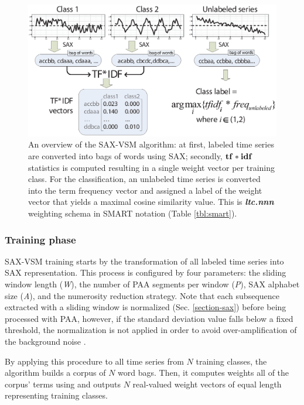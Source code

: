 \begin{figure}[t]
   \centering
   \includegraphics[width=148mm]{figures/SAX-VSM_overview.eps}
   \caption{
   An overview of the SAX-VSM algorithm: 
   at first, labeled time series are converted into bags of words using SAX; 
   secondly, $\text{\textbf{tf}}\ast\text{\textbf{idf}}$ statistics is computed resulting in 
   a single weight vector per training class. For the classification, an unlabeled 
   time series is converted into the term frequency vector and assigned a 
   label of the weight vector that yields a maximal cosine similarity value.
   This is \textit{\textbf{ltc.nnn}} weighting schema in SMART notation (Table \ref{tbl:smart}).}
   \label{fig:sax-vsm_overview}
\end{figure}

\subsubsection{Training phase}
SAX-VSM training starts by the transformation of all labeled time series into SAX representation. 
This process is configured by four parameters: 
the sliding window length (\textit{W}), 
the number of PAA segments per window (\textit{P}), 
SAX alphabet size (\textit{A}),
and the numerosity reduction strategy.
Note that each subsequence extracted with a sliding window is normalized (Sec. \ref{section-sax}) 
before being processed with PAA, however, if the standard deviation value falls below a fixed threshold, 
the normalization is not applied in order to avoid over-amplification of the background noise \cite{sax}. 

By applying this procedure to all time series from $N$ training classes, the algorithm builds a corpus of 
$N$ word bags. 
Then, it computes weights all of the corpus' terms using \tfidf and outputs $N$ real-valued weight vectors of 
equal length representing training classes. 

